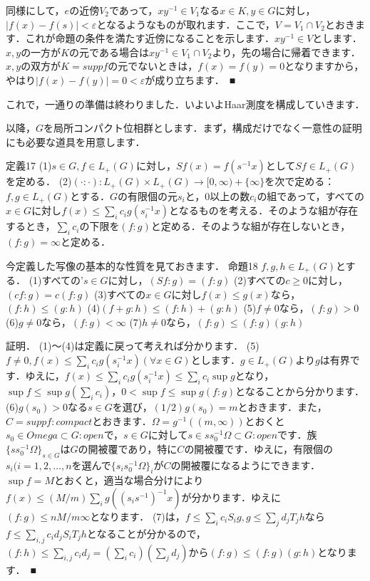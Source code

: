同様にして，$e$の近傍$V_2$であって，$xy^{-1} \in V_1$なる$x \in K, y \in G$に対し，$|f(x)-f(s)|<\varepsilon$となるようなものが取れます．ここで，$V=V_1 \cap V_2$とおきます．これが命題の条件を満たす近傍になることを示します．$xy^{-1} \in V$とします．$x,y$の一方が$K$の元である場合は$xy^{-1} \in V_1 \cap V_2$より，先の場合に帰着できます．$x,y$の双方が$K=supp f$の元でないときは，$f(x)=f(y)=0$となりますから，やはり$|f(x)-f(y)|=0<\varepsilon$が成り立ちます．　■

これで，一通りの準備は終わりました．いよいよHaar測度を構成していきます．

以降，$G$を局所コンパクト位相群とします．まず，構成だけでなく一意性の証明にも必要な道具を用意します．

定義17
(1)$s \in G, f \in L_{+}(G)$に対し，$Sf(x)=f(s^{-1}x)$として$Sf \in L_{+}(G)$を定める．
(2)$(\cdot \colon \cdot ) \colon L_{+}(G) \times L_{+}(G) \to [0, \infty)+\{ \infty \}$を次で定める：$f, g \in L_{+}(G)$とする．$G$の有限個の元$s_i$と，0以上の数$c_i$の組であって，すべての$x \in G$に対し$f(x) \le \sum_{i}c_{i} g(s_{i}^{-1}x)$となるものを考える．そのような組が存在するとき，$\sum_{i}c_i$の下限を$(f \colon g)$と定める．そのような組が存在しないとき，$(f \colon g)=\infty$と定める．

今定義した写像の基本的な性質を見ておきます．
命題18
$f, g, h \in L_{+}(G)$とする．
(1)すべての'$s \in G$に対し，$(Sf \colon g)=(f \colon g)$
(2)すべての$c \ge 0$に対し，$(cf \colon g)=c(f \colon g)$
(3)すべての$x \in G$に対し$f(x) \le g(x)$なら，$(f \colon h) \le (g \colon h)$
(4)$(f+g \colon h) \le (f \colon h)+(g \colon h)$
(5)$f \ne 0$なら，$( f \colon g ) > 0$
(6)$g \ne 0$なら，$( f \colon g ) < \infty $
(7)$h \ne 0$なら，$( f \colon g ) \le (f \colon g ) (g \colon h )$

証明．
(1)〜(4)は定義に戻って考えれば分かります．
(5)$f \ne 0, f(x) \le \sum_{i}c_{i} g(s_{i}^{-1}x) (\forall x \in G)$とします．$g \in L_{+}(G)$より$g$は有界です．ゆえに，$f(x) \le \sum_{i}c_{i} g(s_{i}^{-1}x) \le \sum_{i}c_{i} \sup g$となり，$\sup f \le \sup g ( \sum_{i}c_{i} )$，$0<\sup f \le \sup g (f \colon g )$となることから分かります．
(6)$g(s_{0}) > 0$なる$s \in G$を選び，$(1/2)g(s_{0})=m$とおきます．また，$C=supp f \colon compact$とおきます．$\Omega = g^{-1}( (m, \infty) )$とおくと$s_{0} \in Omega \subset G \colon open$で，$s \in G$に対して$s \in s s_{0}^{-1} \Omega \subset G \colon open$です．族$\{ s s_{0}^{-1}\Omega \}_{s \in G}$は$G$の開被覆であり，特に$C$の開被覆です．ゆえに，有限個の$ s_i(i=1,2, \ldots , n$を選んで$\{ s_{i} s_{0}^{-1}\Omega \}_{i}$が$C$の開被覆になるようにできます．$\sup f=M$とおくと，適当な場合分けにより$f(x) \le (M/m)\sum_{i} g( (s_{i} s^{-1}) ^{-1}x)$が分かります．ゆえに$(f \colon g ) \le nM/m \infty $となります．
(7)は，$f \le \sum_{i} c_{i}S_{i}g, g \le \sum_{j} d_{j}T_{j}h$なら$f \le \sum_{i,j} c_{i}d_{j}S_iT_{j}h$となることが分かるので，$(f \colon h ) \le \sum_{i,j} c_{i}d_{j} = ( \sum_{i} c_{i} ) (\sum_{j} d_{j} )$から$( f \colon g ) \le (f \colon g ) (g \colon h )$となります．　■

